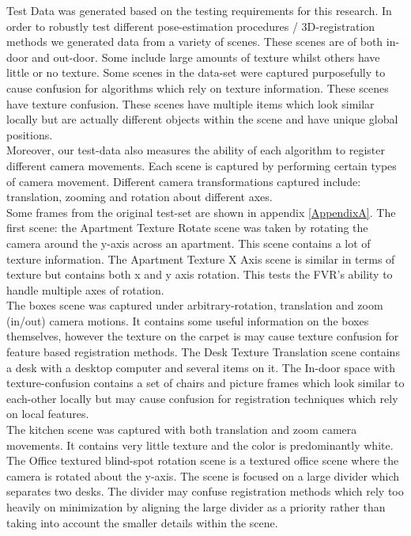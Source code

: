 
Test Data was generated based on the testing requirements for this research. In order to robustly test different pose-estimation procedures / 3D-registration methods we generated data from a variety of scenes. These scenes are of both in-door and out-door. Some include large amounts of texture whilst others have little or no texture. Some scenes in the data-set were captured purposefully to cause confusion for algorithms which rely on texture information. These scenes have texture confusion. These scenes have multiple items which look similar locally but are actually different objects within the scene and have unique global positions. \\

Moreover, our test-data also measures the ability of each algorithm to register different camera movements. Each scene is captured by performing certain types of camera movement. Different camera transformations captured include: translation, zooming and rotation about different axes. \\

Some frames from the original test-set are shown in appendix \ref{AppendixA}. The first scene: the Apartment Texture Rotate scene was taken by rotating the camera around the y-axis across an apartment. This scene contains a lot of texture information. The Apartment Texture X Axis scene is similar in terms of texture but contains both x and y axis rotation. This tests the FVR's ability to handle multiple axes of rotation. \\

The boxes scene was captured under arbitrary-rotation, translation and zoom (in/out) camera motions. It contains some useful information on the boxes themselves, however the texture on the carpet is may cause texture confusion for feature based registration methods. The Desk Texture Translation scene contains a desk with a desktop computer and several items on it. The In-door space with texture-confusion contains a set of chairs and picture frames which look similar to each-other locally but may cause confusion for registration techniques which rely on local features.  \\

The kitchen scene was captured with both translation and zoom camera movements. It contains very little texture and the color is predominantly white. The Office textured blind-spot rotation scene is a textured office scene where the camera is rotated about the y-axis. The scene is focused on a large divider which separates two desks. The divider may confuse registration methods which rely too heavily on minimization by aligning the large divider as a priority rather than taking into account the smaller details within the scene. \\

